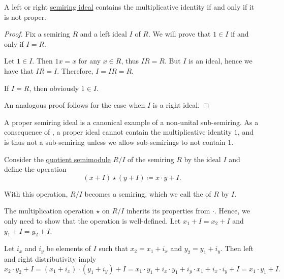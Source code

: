 \begin{proposition}\label{thm:proper_ideals_containing_identity}
  A left or right \hyperref[def:semiring_ideal]{semiring ideal} contains the multiplicative identity if and only if it is not proper.
\end{proposition}
\begin{proof}
  Fix a semiring \( R \) and a left ideal \( I \) of \( R \). We will prove that \( 1 \in I \) if and only if \( I = R \).

  \SufficiencySubProof Let \( 1 \in I \). Then \( 1x = x \) for any \( x \in R \), thus \( IR = R \). But \( I \) is an ideal, hence we have that \( IR = I \). Therefore, \( I = IR = R \).

  \NecessitySubProof If \( I = R \), then obviously \( 1 \in I \).

  An analogous proof follows for the case when \( I \) is a right ideal.
\end{proof}

\begin{remark}\label{rem:semiring_ideal_as_sub_semiring}
  A proper semiring ideal is a canonical example of a non-unital sub-semiring. As a consequence of , a proper ideal cannot contain the multiplicative identity \( 1 \), and is thus not a sub-semiring unless we allow sub-semirings to not contain \( 1 \).
\end{remark}

\begin{definition}\label{def:quotient_semiring}
  Consider the \hyperref[def:quotient_semimodule]{quotient semimodule} \( R / I \) of the semiring \( R \) by the ideal \( I \) and define the operation
  \begin{equation*}
    (x + I) \star (y + I) \coloneqq x \cdot y + I.
  \end{equation*}

  With this operation, \( R / I \) becomes a semiring, which we call the  of \( R \) by \( I \).
\end{definition}
\begin{defproof}
  The multiplication operation \( \star \) on \( R / I \) inherits its properties from \( \cdot \). Hence, we only need to show that the operation is well-defined. Let \( x_1 + I = x_2 + I \) and \( y_1 + I = y_2 + I \).

  Let \( i_x \) and \( i_y \) be elements of \( I \) such that \( x_2 = x_1 + i_x \) and \( y_2 = y_1 + i_y \). Then left and right distributivity imply
  \begin{equation*}
    x_2 \cdot y_2 + I
    =
    (x_1 + i_x) \cdot (y_1 + i_y) + I
    =
    x_1 \cdot y_1 + i_x \cdot y_1 + i_y \cdot x_1 + i_x \cdot i_y + I
    =
    x_1 \cdot y_1 + I.
  \end{equation*}
\end{defproof}

